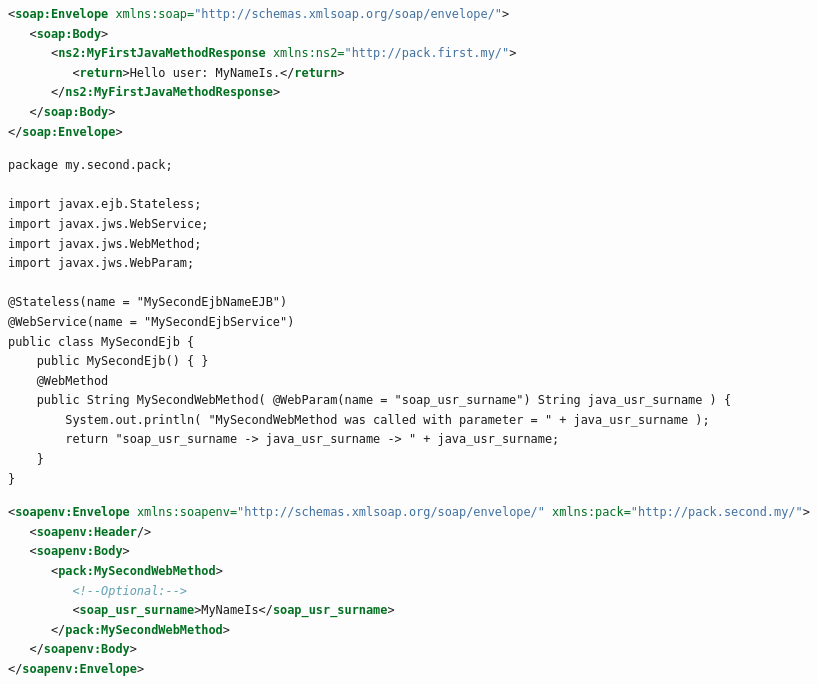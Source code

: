 \documentclass[aspectratio=1610,english]{beamer} %
\begin{document}
	\begin{lrbox}{\afterSoapBox}
		\begin{varwidth}{0.25\textwidth}
			\fontsize{3}{5} \selectfont
				\begin{lstlisting}[style=myCustomStyle, language=XML,
  					morekeywords={soap, ns2,
    				xs:schema, 
    				xs:element, 
    				xs:complexType, 
    				xs:sequence, 
    				xs:attribute},
    				basicstyle=\ttfamily,
					columns=fullflexible,
					showstringspaces=false,
					commentstyle=\color{gray}\upshape, 
					belowskip=-20pt,
					aboveskip=0pt ]
<soap:Envelope xmlns:soap="http://schemas.xmlsoap.org/soap/envelope/">
   <soap:Body>
      <ns2:MyFirstJavaMethodResponse xmlns:ns2="http://pack.first.my/">
         <return>Hello user: MyNameIs.</return>
      </ns2:MyFirstJavaMethodResponse>
   </soap:Body>
</soap:Envelope>							\end{lstlisting}
		\end{varwidth}
	\end{lrbox}

\begin{lrbox}{\secondProjectJavaBox}
		\begin{varwidth}{0.48\textwidth}
			\fontsize{3}{5} \selectfont
				\begin{lstlisting}[style=myCustomStyle]
package my.second.pack;

import javax.ejb.Stateless;
import javax.jws.WebService;
import javax.jws.WebMethod;
import javax.jws.WebParam;

@Stateless(name = "MySecondEjbNameEJB")
@WebService(name = "MySecondEjbService")
public class MySecondEjb {
    public MySecondEjb() { }
    @WebMethod
    public String MySecondWebMethod( @WebParam(name = "soap_usr_surname") String java_usr_surname ) {
    	System.out.println( "MySecondWebMethod was called with parameter = " + java_usr_surname );
        return "soap_usr_surname -> java_usr_surname -> " + java_usr_surname;
    }
}				\end{lstlisting}
		\end{varwidth}
	\end{lrbox}
	
	\begin{lrbox}{\secondProjectSoapRequestBox}
		\begin{varwidth}{0.25\textwidth}
			\fontsize{3}{5} \selectfont
				\begin{lstlisting}[style=myCustomStyle, language=XML,
  					morekeywords={soap, ns2,
    				xs:schema, 
    				xs:element, 
    				xs:complexType, 
    				xs:sequence, 
    				xs:attribute},
    				basicstyle=\ttfamily,
					columns=fullflexible,
					showstringspaces=false,
					commentstyle=\color{gray}\upshape, 
					belowskip=-20pt,
					aboveskip=0pt ]
<soapenv:Envelope xmlns:soapenv="http://schemas.xmlsoap.org/soap/envelope/" xmlns:pack="http://pack.second.my/">
   <soapenv:Header/>
   <soapenv:Body>
      <pack:MySecondWebMethod>
         <!--Optional:-->
         <soap_usr_surname>MyNameIs</soap_usr_surname>
      </pack:MySecondWebMethod>
   </soapenv:Body>
</soapenv:Envelope>							\end{lstlisting}
		\end{varwidth}
	\end{lrbox}
	
\end{document}
